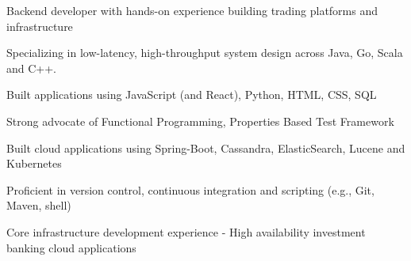 \begin{cvitems}
\sectionspace
\sectionspace
\vspace{1mm}
	\fontsize{11pt}{1.4em}\bodyfontlight\upshape\color{text}
        \item {Backend developer with hands-on experience building trading platforms and infrastructure}
        \item {Specializing in low-latency, high-throughput system design across Java, Go, Scala and C++.}
        \item {Built applications using JavaScript (and React), Python, HTML, CSS, SQL}
        \item {Strong advocate of Functional Programming, Properties Based Test Framework}
        \item {Built cloud applications using Spring-Boot, Cassandra, ElasticSearch, Lucene and Kubernetes}
        \item {Proficient in version control, continuous integration and scripting (e.g., Git, Maven, shell)}
        \item {Core infrastructure development experience - High availability investment banking cloud applications}
        \end{cvitems}
\vspace{1mm}
\sectionspace
